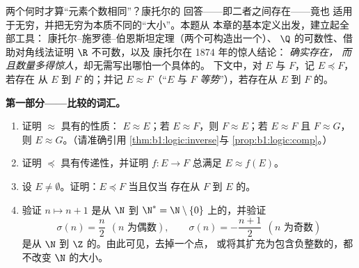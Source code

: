 \begin{problem}\label{pb:b1:logic:1}
两个何时才算“元素个数相同”？康托尔的
回答——即二者之间存在——竟也
适用于无穷，并把无穷为本质不同的“大小”。本题从
本章的基本定义出发，建立起全部工具：
康托尔--施罗德--伯恩斯坦定理（两个可构造出一个）、
$\Q$ 的可数性、借助对角线法证明 $\R$ 不可数，以及
康托尔在 1874 年的惊人结论：
\emph{确实存在，
而且数量多得惊人}，却无需写出哪怕一个具体的。
下文中，对 $E$ 与 $F$，记 $E \preceq F$，若存在
从 $E$ 到 $F$ 的；并记 $E \approx F$（“$E$ 与
$F$ \emph{等势}”），若存在从 $E$
到 $F$ 的。

\medskip
\noindent\textbf{第一部分——比较的词汇。}
\begin{enumerate}
  \item 证明 $\approx$ 具有的性质：
        $E \approx E$；若 $E \approx F$，则 $F \approx E$；若
        $E \approx F$ 且 $F \approx G$，则 $E \approx G$。（请准确引用
        \cref{thm:b1:logic:inverse}与
        \cref{prop:b1:logic:comp}。）
  \item 证明 $\preceq$ 具有传递性，并证明
         $f \colon E \to F$ 总满足 $E \approx f(E)$。
  \item 设 $E \neq \emptyset$。证明：$E \preceq F$ 当且仅当
        存在从 $F$ 到 $E$ 的。
  \item 验证 $n \mapsto n + 1$ 是从 $\N$ 到
        $\N^* = \N \setminus \{0\}$ 上的，并验证
        \[
        \sigma(n) = \frac n2 \ \ (n \text{ 为偶数}), \qquad
        \sigma(n) = -\frac{n+1}2 \ \ (n \text{ 为奇数})
        \]
        是从 $\N$ 到 $\Z$ 的。由此可见，去掉一个点，
        或将其扩充为包含负整数的，都不改变
        $\N$ 的大小。
\end{enumerate}


\end{problem}
